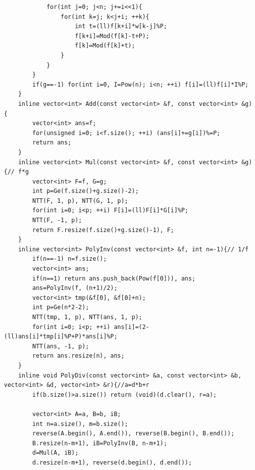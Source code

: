 \documentclass[10pt]{ctexart}
\begin{document}
{\begin{lstlisting}
            for(int j=0; j<n; j+=i<<1){
                for(int k=j; k<j+i; ++k){
                    int t=(ll)f[k+i]*w[k-j]%P;
                    f[k+i]=Mod(f[k]-t+P);
                    f[k]=Mod(f[k]+t);
                }
            }
        }
        if(g==-1) for(int i=0, I=Pow(n); i<n; ++i) f[i]=(ll)f[i]*I%P;
    }
    inline vector<int> Add(const vector<int> &f, const vector<int> &g){
        vector<int> ans=f;
        for(unsigned i=0; i<f.size(); ++i) (ans[i]+=g[i])%=P;
        return ans;
    }
    inline vector<int> Mul(const vector<int> &f, const vector<int> &g){// f*g
        vector<int> F=f, G=g;
        int p=Ge(f.size()+g.size()-2);
        NTT(F, 1, p), NTT(G, 1, p);
        for(int i=0; i<p; ++i) F[i]=(ll)F[i]*G[i]%P;
        NTT(F, -1, p);
        return F.resize(f.size()+g.size()-1), F;
    }
    inline vector<int> PolyInv(const vector<int> &f, int n=-1){// 1/f
        if(n==-1) n=f.size();
        vector<int> ans;
        if(n==1) return ans.push_back(Pow(f[0])), ans;
        ans=PolyInv(f, (n+1)/2);
        vector<int> tmp(&f[0], &f[0]+n);
        int p=Ge(n*2-2);
        NTT(tmp, 1, p), NTT(ans, 1, p);
        for(int i=0; i<p; ++i) ans[i]=(2-(ll)ans[i]*tmp[i]%P+P)*ans[i]%P;
        NTT(ans, -1, p);
        return ans.resize(n), ans;
    }
    inline void PolyDiv(const vector<int> &a, const vector<int> &b, vector<int> &d, vector<int> &r){//a=d*b+r
        if(b.size()>a.size()) return (void)(d.clear(), r=a);

        vector<int> A=a, B=b, iB;
        int n=a.size(), m=b.size();
        reverse(A.begin(), A.end()), reverse(B.begin(), B.end());
        B.resize(n-m+1), iB=PolyInv(B, n-m+1);
        d=Mul(A, iB);
        d.resize(n-m+1), reverse(d.begin(), d.end());


\end{lstlisting}}
\end{document}
